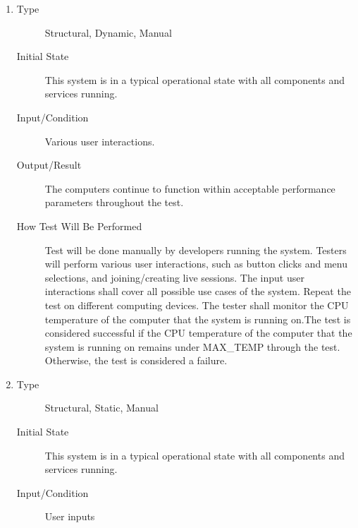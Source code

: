 \documentclass[12pt, titlepage]{article}
\begin{document}
\begin{enumerate}[NFR-T1]
\item \label{NFRT29}
  \begin{description}
  \item[Type] Structural, Dynamic, Manual
  \item[Initial State] This system is in a typical operational state with all
    components and services running.
  \item[Input/Condition] Various user interactions.
  \item[Output/Result] The computers continue to function within acceptable
    performance parameters throughout the test.
  \item[How Test Will Be Performed] Test will be done manually by developers
    running the system. Testers will perform various user interactions, such as
    button clicks and menu selections, and joining/creating live sessions. The
    input user interactions shall cover all possible use cases of the system.
    Repeat the test on different computing devices. The tester shall monitor the
    CPU temperature of the computer that the system is running on.The test is
    considered successful if the CPU temperature of the computer that the system
    is running on remains under MAX\_TEMP through the test. Otherwise,
    the test is considered a failure.
  \end{description}
\item \label{NFRT30}
  \begin{description}
  \item[Type] Structural, Static, Manual
  \item[Initial State] This system is in a typical operational state with all
    components and services running.
  \item[Input/Condition] User inputs

\end{description}
\end{enumerate}
\end{document}

